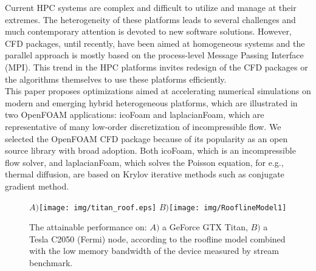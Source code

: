 \documentclass[3p,times]{elsarticle}
\begin{document}
Current HPC systems are complex and difficult to utilize and manage at their extremes. The heterogeneity of these platforms leads to several challenges and much contemporary attention is devoted to new software solutions. However, CFD packages, until recently, have been aimed at homogeneous systems and the parallel approach is mostly based on the process-level Message Passing Interface (MPI). This trend in the HPC platforms invites redesign of the CFD packages or the algorithms themselves to use these platforms efficiently.\\

This paper proposes optimizations aimed at accelerating numerical simulations on modern and emerging hybrid heterogeneous platforms, which are illustrated in two OpenFOAM \cite{openfoam} applications: icoFoam and laplacianFoam, which are representative of many low-order discretization of incompressible flow. We selected the OpenFOAM CFD package because of its popularity as an open source library with broad adoption. Both icoFoam, which is an incompressible flow solver, and laplacianFoam, which solves the Poisson equation, for e.g., thermal diffusion, are based on Krylov iterative methods such as conjugate gradient method. \\

\begin{figure}[h]
\begin{center}
\emph{$A)$}\texttt{[image: img/titan\_roof.eps]}
\emph{$B)$}\texttt{[image: img/RooflineModel1]}
\caption{The attainable performance on: \emph{$A)$} a GeForce GTX Titan, \emph{$B)$} a Tesla C2050 (Fermi)  node, according to the roofline model combined with the low memory bandwidth of the device measured by stream benchmark.}
\label{perf1}
\end{center}
\end{figure}
\end{document}
